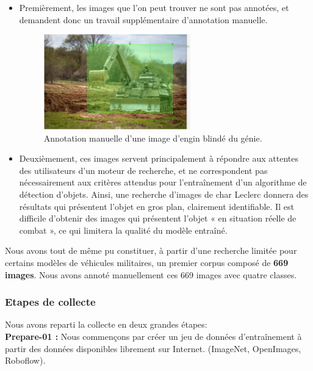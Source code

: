 \begin{itemize}
    \item Premièrement, les images que l’on peut trouver ne sont pas annotées, et demandent donc un travail supplémentaire d’annotation manuelle.
          \begin{figure}[H]
              \center
              \includegraphics[width=0.6\textwidth]{./images/anotation-manuelle.png}
              \caption{Annotation manuelle d’une image d’engin blindé du génie.}\label{fig:anotation-manuelle}
          \end{figure}
    \item Deuxièmement, ces images servent principalement à répondre aux attentes des utilisateurs d’un moteur de recherche, et ne correspondent pas nécessairement aux critères attendus pour l’entraînement d’un algorithme de détection d’objets.
          Ainsi, une recherche d’images de char Leclerc donnera des résultats qui présentent l’objet en gros plan, clairement identifiable.
          Il est difficile d’obtenir des images qui présentent l’objet « en situation réelle de combat », ce qui limitera la qualité du modèle entraîné.
\end{itemize}

Nous avons tout de même pu constituer, à partir d’une recherche limitée pour certains modèles de véhicules militaires, un premier corpus composé de \textbf{669 images}. Nous avons annoté manuellement ces 669 images avec quatre classes.\\


\subsubsection{Etapes de collecte}

Nous avons reparti la collecte en deux grandes étapes:\\

\indent \textbf{Prepare-01 :} Nous commençons par créer un jeu de données d'entraînement à partir des données disponibles librement sur Internet. (ImageNet, OpenImages, Roboflow).

